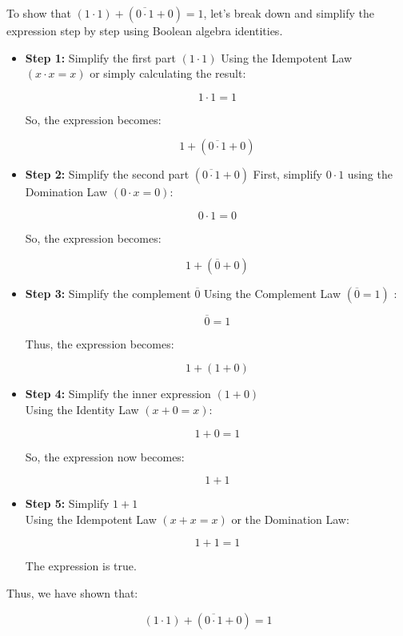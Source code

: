 \begin{solution}
    To show that $(1 \cdot 1)+(\overline{0 \cdot 1}+0)=1$, let's break down and simplify the expression step by step using Boolean algebra identities.

    \begin{itemize}
        \item \textbf{Step 1:} Simplify the first part $(1 \cdot 1)$
                Using the Idempotent Law $(x \cdot x=x)$ or simply calculating the result:
                
                \[
                1 \cdot 1=1
                \]
                
                
                So, the expression becomes:
                
                \[
                1+(\overline{0 \cdot 1}+0)
                \]
        \item \textbf{Step 2:} Simplify the second part $(\overline{0 \cdot 1}+0)$
                First, simplify $0 \cdot 1$ using the Domination Law $(0 \cdot x=0)$:
                
                \[
                0 \cdot 1=0
                \]
                
                
                So, the expression becomes:
                
                \[
                1+(\overline{0}+0)
                \]
        \item \textbf{Step 3:} Simplify the complement $\overline{0}$
    Using the Complement Law $(\overline{0}=1)$ :
    
    \[
    \overline{0}=1
    \]

    
    
    Thus, the expression becomes:
    
    \[
    1+(1+0)
    \]

    \item \textbf{Step 4:} Simplify the inner expression \( (1 + 0) \) \\
        Using the Identity Law \( (x + 0 = x) \):
        
        \[
        1 + 0 = 1
        \]
        
        So, the expression now becomes:
        
        \[
        1 + 1
        \]
        
        \item \textbf{Step 5: }Simplify \( 1 + 1 \) \\
        Using the Idempotent Law \( (x + x = x) \) or the Domination Law:
        
        \[
        1 + 1 = 1
        \]
        
        The expression is true. \end{itemize}
        Thus, we have shown that:
        
        \[
        (1 \cdot 1) + (\overline{0 \cdot 1} + 0) = 1
        \]
        \end{solution}

